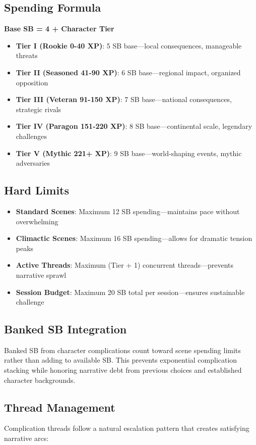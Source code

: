 \subsection*{Spending Formula}
\textbf{Base SB = 4 + Character Tier}
\begin{itemize}
    \item \textbf{Tier I (Rookie 0-40 XP)}: 5 SB base---local consequences, manageable threats
    \item \textbf{Tier II (Seasoned 41-90 XP)}: 6 SB base---regional impact, organized opposition
    \item \textbf{Tier III (Veteran 91-150 XP)}: 7 SB base---national consequences, strategic rivals
    \item \textbf{Tier IV (Paragon 151-220 XP)}: 8 SB base---continental scale, legendary challenges
    \item \textbf{Tier V (Mythic 221+ XP)}: 9 SB base---world-shaping events, mythic adversaries
\end{itemize}

\subsection*{Hard Limits}
\begin{itemize}
    \item \textbf{Standard Scenes}: Maximum 12 SB spending---maintains pace without overwhelming
    \item \textbf{Climactic Scenes}: Maximum 16 SB spending---allows for dramatic tension peaks
    \item \textbf{Active Threads}: Maximum (Tier + 1) concurrent threads---prevents narrative sprawl
    \item \textbf{Session Budget}: Maximum 20 SB total per session---ensures sustainable challenge
\end{itemize}

\subsection*{Banked SB Integration}
Banked SB from character complications count toward scene spending limits rather than adding to available SB. This prevents exponential complication stacking while honoring narrative debt from previous choices and established character backgrounds.

\subsection*{Thread Management}
Complication threads follow a natural escalation pattern that creates satisfying narrative arcs:

